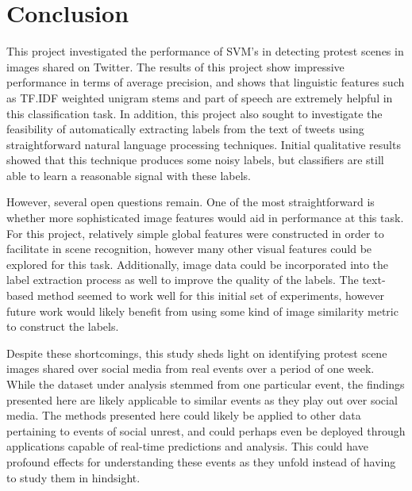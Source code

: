 \documentclass[twoside,11pt]{article}
\begin{document}
\section{Conclusion}
This project investigated the performance of SVM's in detecting protest scenes in images shared on Twitter. The results of this project show impressive performance in terms of average precision, and shows that linguistic features such as TF.IDF weighted unigram stems and part of speech are extremely helpful in this classification task. In addition, this project also sought to investigate the feasibility of automatically extracting labels from the text of tweets using straightforward natural language processing techniques. Initial qualitative results showed that this technique produces some noisy labels, but classifiers are still able to learn a reasonable signal with these labels.
\par
However, several open questions remain. One of the most straightforward is whether more sophisticated image features would aid in performance at this task. For this project, relatively simple global features were constructed in order to facilitate in scene recognition, however many other visual features could be explored for this task. Additionally, image data could be incorporated into the label extraction process as well to improve the quality of the labels. The text-based method seemed to work well for this initial set of experiments, however future work would likely benefit from using some kind of image similarity metric to construct the labels.
\par
Despite these shortcomings, this study sheds light on identifying protest scene images shared over social media from real events over a period of one week. While the dataset under analysis  stemmed from one particular event, the findings presented here are likely applicable to similar events as they play out over social media. The methods presented here could likely be applied to other data pertaining to events of social unrest, and could perhaps even be deployed through applications capable of real-time predictions and analysis. This could have profound effects for understanding these events as they unfold instead of having to study them in hindsight.


\label{app:theorem}




\end{document}
